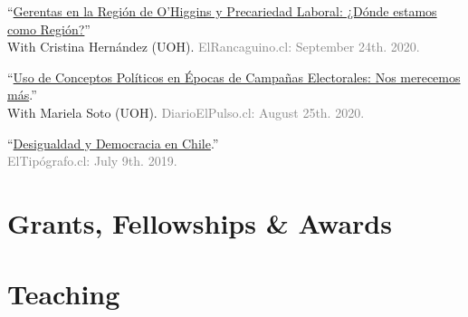 \documentclass[letterpaper]{article}
\renewenvironment{itemize}{
  \begin{list}{}{
    \setlength{\leftmargin}{1.5em}
  }
}{
  \end{list}
}
\begin{document}
\begin{itemize}
    \item[\textcolor{gray}{\textbullet}] ``\href{https://www.elrancaguino.cl/2020/09/24/gerentas-en-la-region-de-ohiggins-y-precariedad-laboral-donde-estamos-como-region/}{Gerentas en la Regi\'on de O'Higgins y Precariedad Laboral: ¿D\'onde estamos como Regi\'on?}''\\With Cristina Hern\'andez (UOH). \textcolor{gray}{ElRancaguino.cl: September 24th. 2020.}
   
    \item[\textcolor{gray}{\textbullet}] ``\href{https://www.diarioelpulso.cl/2020/08/25/uso-de-conceptos-politicos-en-epocas-de-campanas-electorales-nos-merecemos-mas/}{Uso de Conceptos Pol\'iticos en \'Epocas de Campa\~nas Electorales: Nos merecemos m\'as}.''\\With Mariela Soto (UOH). \textcolor{gray}{DiarioElPulso.cl: August 25th. 2020.}
   
    \item[\textcolor{gray}{\textbullet}] ``\href{https://eltipografo.cl/2019/07/desigualdad-y-democracia-en-chile}{Desigualdad y Democracia en Chile}.''\\\textcolor{gray}{ElTip\'ografo.cl: July 9th. 2019.}


  \end{itemize}

\section*{Grants, Fellowships \& Awards}
{\unskip}



\section*{Teaching}

{\unskip}

\end{document}
